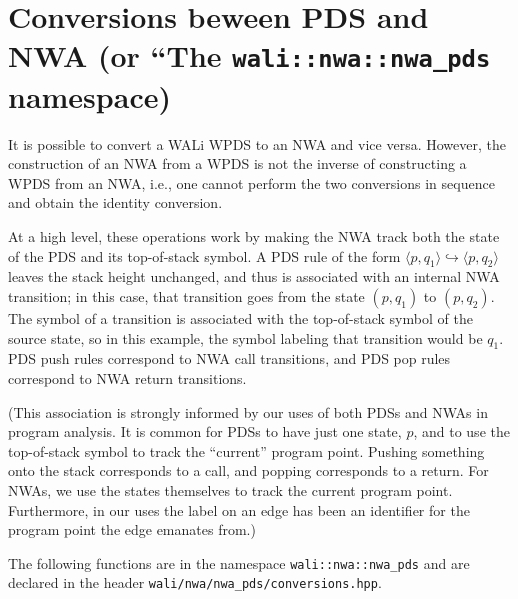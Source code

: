 \section{Conversions beween PDS and NWA (or ``The
  \texttt{wali::nwa::nwa\_pds} namespace)}
\label{Se:Conversions}


It is possible to convert a WALi WPDS to an NWA and vice versa.
However, the construction of an NWA from a WPDS is not the inverse
of constructing a WPDS from an NWA, i.e., one cannot perform the two
conversions in sequence and obtain the identity conversion.

At a high level, these operations work by making the NWA track both the state
of the PDS and its top-of-stack symbol. A PDS rule of the form $\langle
p,q_1 \rangle \hookrightarrow \langle p,q_2 \rangle$ leaves the stack height
unchanged, and thus is associated with an internal NWA transition; in this
case, that transition goes from the state $(p,q_1)$ to $(p,q_2)$. The symbol
of a transition is associated with the top-of-stack symbol of the source
state, so in this example, the symbol labeling that transition would be
$q_1$. PDS push rules correspond to NWA call transitions, and PDS pop rules
correspond to NWA return transitions.

(This association is strongly informed by our uses of both PDSs and NWAs in
program analysis. It is common for PDSs to have just one state, $p$, and to
use the top-of-stack symbol to track the ``current'' program point. Pushing
something onto the stack corresponds to a call, and popping corresponds to a
return. For NWAs, we use the states themselves to track the current program
point. Furthermore, in our uses the label on an edge has been an identifier
for the program point the edge emanates from.)


The following functions are in the namespace \texttt{wali::nwa::nwa\_pds} and
are declared in the header \texttt{wali/nwa/nwa\_pds/conversions.hpp}.


